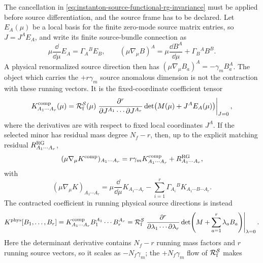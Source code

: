 \begin{construction}
The cancellation in
\eqref{eq:instanton-source-functional-rg-invariance} must be applied before
source differentiation, and the source frame has to be declared.  Let
\(E_A(\mu)\) be a local basis for the finite zero-mode source matrix entries,
so \(J=J^A E_A\), and write its finite source-bundle connection as
\begin{equation}
  \mu\frac{\dd}{\dd\mu}E_A=\Gamma_A{}^B E_B,
  \qquad
  (\mu\nabla_\mu B)^A
  =
  \mu\frac{\dd B^A}{\dd\mu}+\Gamma_B{}^A B^B .
  \label{eq:instanton-source-bundle-connection}
\end{equation}
A physical renormalized source direction then has
\((\mu\nabla_\mu B_a)^A=-\gamma_m B_a^A\).  The object which carries the
\(+r\gamma_m\) source anomalous dimension is not the contraction with these
running vectors.  It is the fixed-coordinate coefficient tensor
\begin{equation}
  K^{\rm comp}_{A_1\cdots A_r}(\mu)
  =
  \mathcal R_{\rm f}^{\mathcal S}(\mu)
  \left.
  \frac{\partial^r}
    {\partial J^{A_1}\cdots\partial J^{A_r}}
  \det\!\left(M(\mu)+J^A E_A(\mu)\right)
  \right|_{J=0},
  \label{eq:instanton-mass-source-rg-differentiated-coefficient}
\end{equation}
where the derivatives are with respect to fixed local coordinates \(J^A\).
If the selected minor has residual mass degree \(N_f-r\), then, up to the
explicit matching residual \(R^{\rm RG}_{A_1\cdots A_r}\),
\begin{equation}
  (\mu\nabla_\mu K^{\rm comp})_{A_1\cdots A_r}
  =
  r\gamma_m K^{\rm comp}_{A_1\cdots A_r}
  +R^{\rm RG}_{A_1\cdots A_r},
  \label{eq:instanton-mass-source-rg-channel-flow}
\end{equation}
with
\[
  (\mu\nabla_\mu K)_{A_1\cdots A_r}
  =
  \mu\frac{\dd}{\dd\mu}K_{A_1\cdots A_r}
  -\sum_{i=1}^r
  \Gamma_{A_i}{}^B K_{A_1\cdots B\cdots A_r}.
\]
The contracted coefficient in running physical source directions is instead
\begin{equation}
  K^{\rm phys}[B_1,\ldots,B_r]
  =
  K^{\rm comp}_{A_1\cdots A_r}
  B_1^{A_1}\cdots B_r^{A_r}
  =
  \mathcal R_{\rm f}^{\mathcal S}
  \left.
  \frac{\partial^r}
    {\partial\lambda_1\cdots\partial\lambda_r}
  \det\!\left(M+\sum_{a=1}^r\lambda_a B_a\right)
  \right|_{\lambda=0}.
  \label{eq:instanton-running-source-rg-contraction}
\end{equation}
Here the determinant derivative contains \(N_f-r\) running mass factors and
\(r\) running source vectors, so it scales as \(-N_f\gamma_m\); the
\(+N_f\gamma_m\) flow of \(\mathcal R_{\rm f}^{\mathcal S}\) makes

\end{construction}

